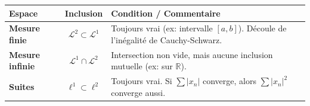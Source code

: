 {%
\begin{center}
\begin{tabular}{l c p{7cm}}

\textbf{Espace} & \textbf{Inclusion} & \textbf{Condition / Commentaire} \\
\hline
\textbf{Mesure finie} & $\mathcal{L}^2 \subset \mathcal{L}^1$ & Toujours vrai (ex: intervalle $[a, b]$). Découle de l'inégalité de Cauchy-Schwarz. \\

\textbf{Mesure infinie} & $\mathcal{L}^1 \cap \mathcal{L}^2$ & Intersection non vide, mais aucune inclusion mutuelle (ex: sur $\mathbb{R}$). \\

\textbf{Suites} & $\ell^1 \subset \ell^2$ & Toujours vrai. Si $\sum |x_n|$ converge, alors $\sum |x_n|^2$ converge aussi. \\

\end{tabular}
\end{center}

}

